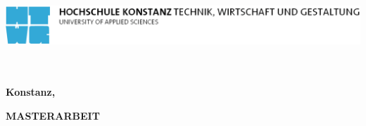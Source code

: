 
\begin{titlepage}

\vspace*{-3.5cm}

\begin{center} %
\hspace*{-1cm} \includegraphics[width=15.7cm]{figures/htwg-logo}
\end{center} %

\vspace{2.5cm}

\begin{center}
	\huge{
		\textbf{\thema} \\[5cm]
	}
	\Large{
		\textbf{\autor}} \\[6.5cm]
	\large{
		\textbf{Konstanz, \abgabedatum} \\[2.3cm]
	}

	\Huge{
		\textbf{{\sf MASTERARBEIT}}
	}
\end{center}

\end{titlepage}
